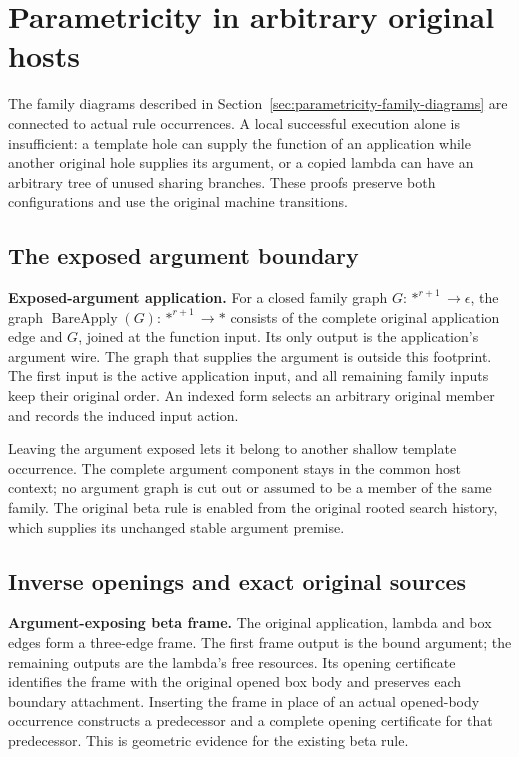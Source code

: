 \clearpage
\section{Parametricity in arbitrary original hosts}
\label{sec:parametricity-universal-hosts}
The family diagrams described in Section~\ref{sec:parametricity-family-diagrams}
are connected to actual rule occurrences. A local successful execution
alone is insufficient: a template hole can supply the function of an
application while another original hole supplies its argument, or a copied
lambda can have an arbitrary tree of unused sharing branches. These proofs
preserve both configurations and use the original machine transitions.

\subsection{The exposed argument boundary}
\textbf{Exposed-argument application.} For a closed family graph
$G:*^{r+1}\to\epsilon$, the graph $\operatorname{BareApply}(G):*^{r+1}\to *$
consists of the complete original application edge and $G$, joined at the
function input. Its only output is the application's argument wire. The graph
that supplies the argument is outside this footprint. The first input is the
active application input, and all remaining family inputs keep their original
order. An indexed form selects an arbitrary original member and records the
induced input action.

Leaving the argument exposed lets it belong to another shallow template
occurrence. The complete argument component stays in the common host context;
no argument graph is cut out or assumed to be a member of the same family.
The original beta rule is enabled from the original rooted search history,
which supplies its unchanged stable argument premise.

\subsection{Inverse openings and exact original sources}
\textbf{Argument-exposing beta frame.} The original application, lambda and
box edges form a three-edge frame. The first frame output is the bound argument;
the remaining outputs are the lambda's free resources. Its opening certificate
identifies the frame with the original opened box body and preserves each
boundary attachment. Inserting the frame in place of an actual opened-body
occurrence constructs a predecessor and a complete opening certificate for
that predecessor. This is geometric evidence for the existing beta rule.


